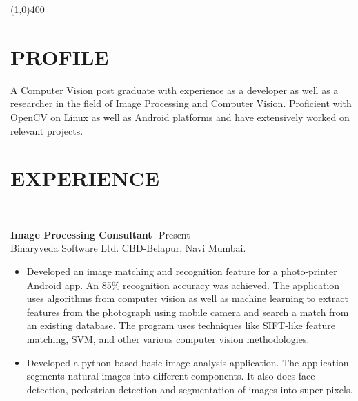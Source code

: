 \documentclass{res}
\begin{document}
 

\address{deven.patel2@gmail.com\\\hspace{6mm}+919819482499}         
\begin{resume}
\begin{center}
\line(1,0){400}
\end{center}
 
\section{PROFILE}
 A Computer Vision post graduate with  experience as a developer as well as a
 researcher in the field of Image Processing and Computer Vision.  Proficient
 with OpenCV  on Linux as well as Android platforms and have extensively worked on
 relevant projects. 
 \section{EXPERIENCE}
 
   \vspace{-0.05in}	
   \begin{tabbing}
   \hspace{2.3in}\= \hspace{2.6in}\= \kill %
   
    {\bf Image Processing Consultant}     \> -Present\\
        Binaryveda Software Ltd. \>  \>CBD-Belapur, Navi Mumbai. 
   \end{tabbing}      %

    \begin{itemize}
        \item Developed an image matching and recognition feature for a
        photo-printer Android app.  An 85\% recognition accuracy  was achieved. The application uses algorithms from
        computer vision as well as machine learning to extract features from the  photograph using mobile
        camera and 	search a match from an existing database. The program uses techniques like SIFT-like feature matching, SVM, and other various computer vision methodologies. 	
        \item Developed
        a python based basic image analysis application. The application
        segments natural  images into different components. It  also does
        face detection, pedestrian 	detection and segmentation of  images
        into super-pixels.


\end{itemize}
\end{resume}
\end{document}
